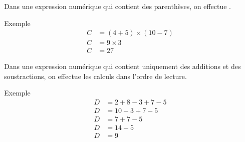 \documentclass[xcolor={dvipsnames}]{beamer}
\begin{document}
\begin{frame}
	\begin{myprop}
		Dans une expression numérique qui contient des parenthèses, on effectue 	. \pause
	\end{myprop}
	
	\begin{exampleblock}{Exemple}
		\begin{align*}
			C &= (4+5) \times (10-7) \\
			C &= 9 \times 3 \\
			C &= 27
		\end{align*}
	\end{exampleblock}
\end{frame}

\begin{frame}
	\begin{myprop}
	Dans une expression numérique qui contient uniquement des additions et des soustractions, on effectue les calculs dans l'ordre de lecture. \pause
	\end{myprop}
	
	\begin{exampleblock}{Exemple}
		\begin{align*}
			D &= 2 + 8 - 3 + 7 -5 \\
			D &= 10 - 3 + 7 -5 \\
			D &= 7 + 7 -5 \\
			D &= 14 -5 \\
			D &= 9
		\end{align*}
	\end{exampleblock}
\end{frame}
\end{document}
